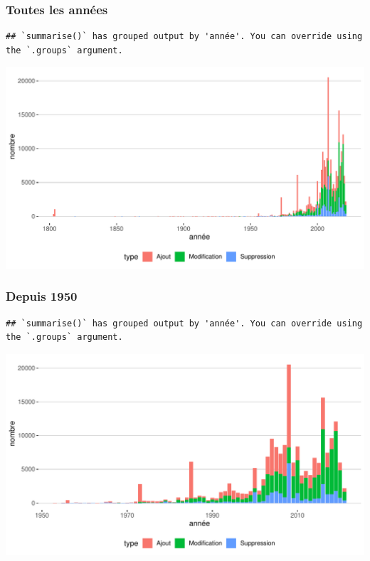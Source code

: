 \documentclass[
  oneside]{book}
\begin{document}
\hypertarget{toutes-les-annuxe9es}{%
\subsubsection{Toutes les années}\label{toutes-les-annuxe9es}}

\begin{verbatim}
## `summarise()` has grouped output by 'année'. You can override using the `.groups` argument.
\end{verbatim}

\includegraphics{05-images_files/figure-latex/global-1.pdf}

\hypertarget{depuis-1950}{%
\subsubsection{Depuis 1950}\label{depuis-1950}}

\begin{verbatim}
## `summarise()` has grouped output by 'année'. You can override using the `.groups` argument.
\end{verbatim}

\includegraphics{05-images_files/figure-latex/global.zoom-1.pdf}
\end{document}
